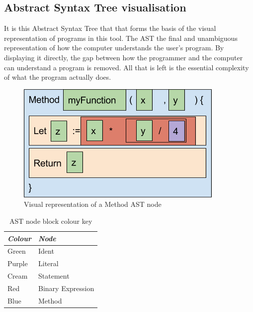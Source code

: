 \subsection{Abstract Syntax Tree visualisation}

It is this Abstract Syntax Tree that that forms the basis of the visual representation of programs in this tool. The AST the final and unambiguous representation of how the computer understands the user’s program. By displaying it directly, the gap between how the programmer and the computer can understand a program is removed. All that is left is the essential complexity of what the program actually does.

\begin{figure}[H]
\centering
\includegraphics[scale=0.5]{graphics/astdesign} %
\caption{Visual representation of a Method AST node}
\label{fig:astdesign} %
\end{figure}

\begin{table}[H]
\centering
\caption{AST node block colour key}
\label{fig:astcolourkey}
\begin{tabular}{|l|l|}
\hline
\textit{\textbf{Colour}} & \textit{\textbf{Node}} \\ \hline
Green                    & Ident                  \\ \hline
Purple                   & Literal                \\ \hline
Cream                    & Statement              \\ \hline
Red                      & Binary Expression      \\ \hline
Blue                     & Method                 \\ \hline
\end{tabular}
\end{table}

